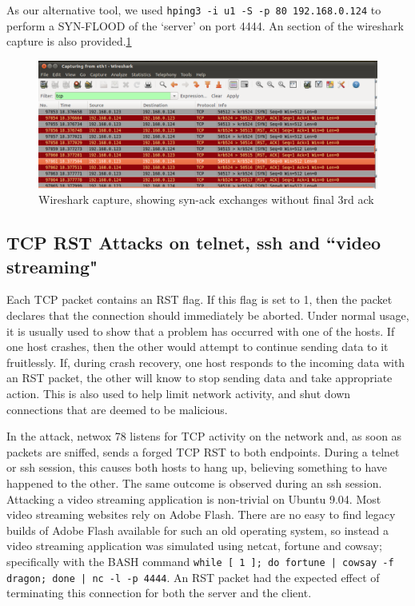 As our alternative tool, we used {\tt hping3 -i u1 -S -p 80 192.168.0.124} to perform a SYN-FLOOD of the `server' on
port 4444. An section of the wireshark capture is also provided.\ref{fig:ws-rst}

\begin{figure}[h] \centering \includegraphics[width=.75\linewidth]{images/ws-rst-crop.png} \caption{Wireshark capture,
showing syn-ack exchanges without final 3rd ack} \label{fig:ws-rst} \end{figure}

\subsection{TCP RST Attacks on telnet, ssh and ``video streaming"}

Each TCP packet contains an RST flag. If this flag is set to 1, then the packet declares that the connection should
immediately be aborted. Under normal usage, it is usually used to show that a problem has occurred with one of the
hosts. If one host crashes, then the other would attempt to continue sending data to it fruitlessly. If, during crash
recovery, one host responds to the incoming data with an RST packet, the other will know to stop sending data and take
appropriate action. This is also used to help limit network activity, and shut down connections that are deemed to be
malicious.

In the attack, netwox 78 listens for TCP activity on the network and, as soon as packets are sniffed, sends a forged TCP
RST to both endpoints. During a telnet or ssh session, this causes both hosts to hang up, believing something to have
happened to the other. The same outcome is observed during an ssh session. Attacking a video streaming application is
non-trivial on Ubuntu 9.04. Most video streaming websites rely on Adobe Flash. There are no easy to find legacy builds
of Adobe Flash available for such an old operating system, so instead a video streaming application was simulated using
netcat, fortune and cowsay; specifically with the BASH command {\tt while [ 1 ]; do fortune | cowsay -f dragon; done |
nc -l -p 4444}. An RST packet had the expected effect of terminating this connection for both the server and the client.

